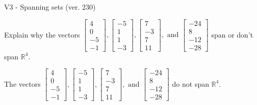\begin{exercise}
  \begin{exerciseTitle}V3 - Spanning sets (ver. 230)\end{exerciseTitle}
  \begin{exerciseStatement}
    Explain why the vectors \(\left[\begin{array}{r}
4 \\
0 \\
-5 \\
-1
\end{array}\right] , \left[\begin{array}{r}
-5 \\
1 \\
1 \\
-3
\end{array}\right] , \left[\begin{array}{r}
7 \\
-3 \\
7 \\
11
\end{array}\right] , \text{ and } \left[\begin{array}{r}
-24 \\
8 \\
-12 \\
-28
\end{array}\right]\) span or don't span \(\mathbb{R}^4\). 
	


  \end{exerciseStatement}
  \begin{exerciseAnswer}
   The vectors \(\left[\begin{array}{r}
4 \\
0 \\
-5 \\
-1
\end{array}\right] , \left[\begin{array}{r}
-5 \\
1 \\
1 \\
-3
\end{array}\right] , \left[\begin{array}{r}
7 \\
-3 \\
7 \\
11
\end{array}\right] , \text{ and } \left[\begin{array}{r}
-24 \\
8 \\
-12 \\
-28
\end{array}\right]\) 
  	 do not  
	span \(\mathbb{R}^4\).
  


  \end{exerciseAnswer}
\end{exercise}